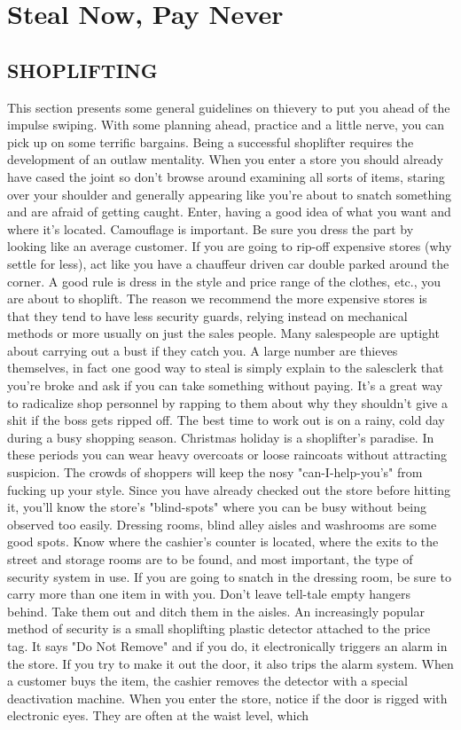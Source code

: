 \documentclass[11pt,twoside,a4paper]{book}
\begin{document}
\section{Steal Now, Pay Never}

\subsection{SHOPLIFTING}

This section presents some general guidelines on thievery to put you ahead of the impulse swiping. With some planning ahead, practice and a little nerve, you can pick up on some terrific bargains. Being a successful shoplifter requires the development of an outlaw mentality. When you enter a store you should already have cased the joint so don't browse around examining all sorts of items, staring over your shoulder and generally appearing like you're about to snatch something and are afraid of getting caught. Enter, having a good idea of what you want and where it's located. Camouflage is important. Be sure you dress the part by looking like an average customer. If you are going to rip-off expensive stores (why settle for less), act like you have a chauffeur driven car double parked around the corner. A good rule is dress in the style and price range of the clothes, etc., you are about to shoplift. The reason we recommend the more expensive stores is that they tend to have less security guards, relying instead on mechanical methods or more usually on just the sales people. Many salespeople are uptight about carrying out a bust if they catch you. A large number are thieves themselves, in fact one good way to steal is simply explain to the salesclerk that you're broke and ask if you can take something without paying. It's a great way to radicalize shop personnel by rapping to them about why they shouldn't give a shit if the boss gets ripped off. The best time to work out is on a rainy, cold day during a busy shopping season. Christmas holiday is a shoplifter's paradise. In these periods you can wear heavy overcoats or loose raincoats without attracting suspicion. The crowds of shoppers will keep the nosy "can-I-help-you's" from fucking up your style. Since you have already checked out the store before hitting it, you'll know the store's "blind-spots" where you can be busy without being observed too easily. Dressing rooms, blind alley aisles and washrooms are some good spots. Know where the cashier's counter is located, where the exits to the street and storage rooms are to be found, and most important, the type of security system in use. If you are going to snatch in the dressing room, be sure to carry more than one item in with you. Don't leave tell-tale empty hangers behind. Take them out and ditch them in the aisles. An increasingly popular method of security is a small shoplifting plastic detector attached to the price tag. It says "Do Not Remove" and if you do, it electronically triggers an alarm in the store. If you try to make it out the door, it also trips the alarm system. When a customer buys the item, the cashier removes the detector with a special deactivation machine. When you enter the store, notice if the door is rigged with electronic eyes. They are often at the waist level, which 
\end{document}
